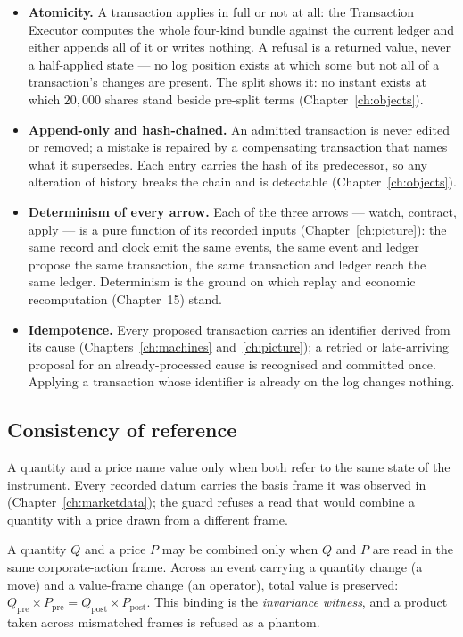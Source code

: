 \begin{itemize}[leftmargin=1.4em,itemsep=2pt]
\item \textbf{Atomicity.} A transaction applies in full or not at all: the
  Transaction Executor computes the whole four-kind bundle against the current
  ledger and either appends all of it or writes nothing. A refusal is a returned
  value, never a half-applied state --- no log position exists at which some but
  not all of a transaction's changes are present. The split shows it: no instant
  exists at which $20{,}000$ shares stand beside pre-split terms
  (Chapter~\ref{ch:objects}).
\item \textbf{Append-only and hash-chained.} An admitted transaction is never
  edited or removed; a mistake is repaired by a compensating transaction that
  names what it supersedes. Each entry carries the hash of its predecessor, so
  any alteration of history breaks the chain and is detectable
  (Chapter~\ref{ch:objects}).
\item \textbf{Determinism of every arrow.} Each of the three arrows --- watch,
  contract, apply --- is a pure function of its recorded inputs
  (Chapter~\ref{ch:picture}): the same record and clock emit the same events, the
  same event and ledger propose the same transaction, the same transaction and
  ledger reach the same ledger. Determinism is the ground on which replay and
  economic recomputation (Chapter~15) stand.
\item \textbf{Idempotence.} Every proposed transaction carries an identifier
  derived from its cause (Chapters~\ref{ch:machines} and~\ref{ch:picture}); a
  retried or late-arriving proposal for an already-processed cause is recognised
  and committed once. Applying a transaction whose identifier is already on the
  log changes nothing.
\end{itemize}

\subsection{Consistency of reference}

A quantity and a price name value only when both refer to the same state of the
instrument. Every recorded datum carries the basis frame it was observed in
(Chapter~\ref{ch:marketdata}); the guard refuses a read that would combine a
quantity with a price drawn from a different frame.

\begin{invariant}\label{inv:consistency}
A quantity $Q$ and a price $P$ may be combined only when $Q$ and $P$ are read in
the same corporate-action frame. Across an event carrying a quantity change (a
move) and a value-frame change (an operator), total value is preserved:
$Q_{\text{pre}}\times P_{\text{pre}} = Q_{\text{post}}\times P_{\text{post}}$.
This binding is the \emph{invariance witness}, and a product taken across
mismatched frames is refused as a phantom.
\end{invariant}

